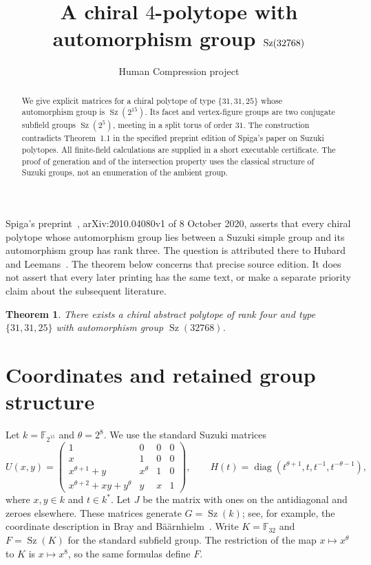 \documentclass[11pt,a4paper]{article}
\title{A chiral $4$-polytope with automorphism group $\Sz(32768)$}
\author{Human Compression project}
\date{}
\newtheorem{theorem}{Theorem}
\newcommand{\Sz}{\operatorname{Sz}}
\newcommand{\F}{\mathbb F}
\begin{document}
\maketitle
\begin{abstract}
We give explicit matrices for a chiral polytope of type $\{31,31,25\}$
whose automorphism group is $\Sz(2^{15})$. Its facet and vertex-figure
groups are two conjugate subfield groups $\Sz(2^5)$, meeting in a split
torus of order $31$. The construction contradicts Theorem~1.1 in the
specified preprint edition of Spiga's paper on Suzuki polytopes.
All finite-field calculations are supplied in a short executable
certificate. The proof of generation and of the intersection property
uses the classical structure of Suzuki groups, not an enumeration of
the ambient group.
\end{abstract}

Spiga's preprint~\cite{Spiga}, arXiv:2010.04080v1 of 8 October 2020,
asserts that every chiral polytope whose automorphism group lies between
a Suzuki simple group and its automorphism group has rank three.
The question is attributed there to Hubard and Leemans~\cite{HL}.
The theorem below concerns that precise source edition. It does not
assert that every later printing has the same text, or make a separate
priority claim about the subsequent literature.

\begin{theorem}\label{main}
There exists a chiral abstract polytope of rank four and type
$\{31,31,25\}$ with automorphism group $\Sz(32768)$.
\end{theorem}

\section{Coordinates and retained group structure}
Let $k=\F_{2^{15}}$ and $\theta=2^8$. We use the standard Suzuki
matrices
\[
 U(x,y)=\begin{pmatrix}
 1&0&0&0\\x&1&0&0\\x^{\theta+1}+y&x^\theta&1&0\\
 x^{\theta+2}+xy+y^\theta&y&x&1
 \end{pmatrix},\qquad
 H(t)=\operatorname{diag}(t^{\theta+1},t,t^{-1},t^{-\theta-1}),
\]
where $x,y\in k$ and $t\in k^*$. Let $J$ be the matrix with ones on
the antidiagonal and zeroes elsewhere. These matrices generate
$G=\Sz(k)$; see, for example, the coordinate description in
Bray and B\"a\"arnhielm~\cite{Recognition}. Write $K=\F_{32}$ and
$F=\Sz(K)$ for the standard subfield group. The restriction of the
map $x\mapsto x^\theta$ to $K$ is $x\mapsto x^8$, so the same
formulas define $F$.
\end{document}
